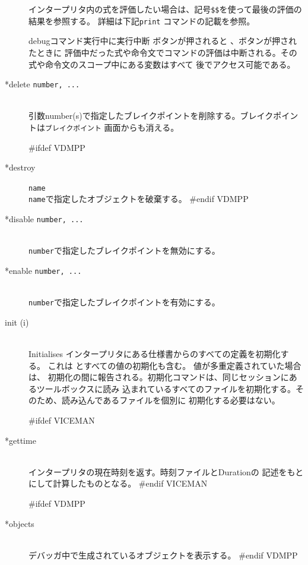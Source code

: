 \documentclass[\pformat,12pt]{article}
\newcommand{\guicmd}[1]{{\sf #1}}
\newcommand{\guicmd}[1]{{\gt #1}}
\begin{document}
\begin{description}
  インタープリタ内の式を評価したい場合は、記号{\tt \$\$}\index{\$\$}を使って最後の評価の結果を参照する。
  詳細は下記{\tt print} コマンドの記載を参照。
  
  debugコマンド実行中に\guicmd{実行中断} ボタンが押されると 、ボタンが押されたときに
  評価中だった式や命令文でコマンドの評価は中断される。その式や命令文のスコープ中にある変数はすべて
  後でアクセス可能である。
  
\item[*delete {\tt number, ...}] 
\mbox{}\\
  引数number(s)で指定したブレイクポイントを削除する。ブレイクポイントは\texttt{ブレイクポイント} 画面からも消える。
  
#ifdef VDMPP
\item[*destroy] {\tt name}\mbox{}\\
  {\tt name}で指定したオブジェクトを破棄する。
#endif VDMPP

\item[*disable \texttt{number, ...}]
\mbox{}\\
  \texttt{number}で指定したブレイクポイントを無効にする。

\item[*enable \texttt{number, ...}]
\mbox{}\\
  \texttt{number}で指定したブレイクポイントを有効にする。
  
\item[init (i)] \mbox{}\\ Initialises
  インタープリタにある仕様書からのすべての定義を初期化する。%
  これは%
   とすべての値の初期化も含む。%
  値が多重定義されていた場合は、%
  初期化の間に報告される。初期化コマンドは、同じセッションにあるツールボックスに読み%
  込まれているすべてのファイルを初期化する。そのため、読み込んであるファイルを個別に%
  初期化する必要はない。
  
#ifdef VICEMAN
\item[*gettime]\mbox{}\\
  インタープリタの現在時刻を返す。時刻ファイルとDurationの
  記述をもとにして計算したものとなる。
#endif VICEMAN

#ifdef VDMPP
\item[*objects] \mbox{}\\
  デバッガ中で生成されているオブジェクトを表示する。
#endif VDMPP


\end{description}
\end{document}
